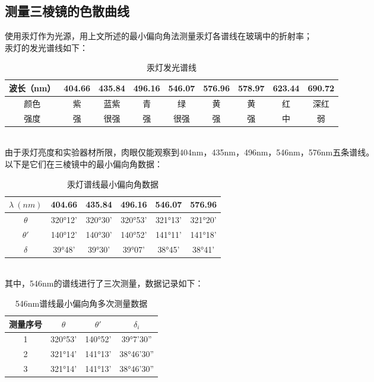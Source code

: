 \documentclass[UTF8]{ctexart}
\begin{document}
\subsection{测量三棱镜的色散曲线}
使用汞灯作为光源，用上文所述的最小偏向角法测量汞灯各谱线在玻璃中的折射率；\\
汞灯的发光谱线如下：\\
\begin{table}[h]
    \begin{center}
        \begin{tabular}{|c|c|c|c|c|c|c|c|c|}  
            \hline    
            波长（nm）& 404.66 & 435.84 & 496.16 & 546.07 & 576.96 & 578.97 & 623.44 & 690.72 \\
            \hline
            颜色 & 紫 & 蓝紫  & 青 & 绿 & 黄 & 黄 & 红 & 深红 \\
            \hline
            强度 &强 &很强 & 强 &很强 & 强 & 强 & 中 & 弱 \\
            \hline
        \end{tabular}
        \caption{汞灯发光谱线}
    \end{center}
\end{table}
\\
由于汞灯亮度和实验器材所限，肉眼仅能观察到404nm，435nm，496nm，546nm，576nm五条谱线。
\\
以下是它们在三棱镜中的最小偏向角数据：\\
\begin{table}[h]
    \begin{center}
        \begin{tabular}{|c|c|c|c|c|c|}
        \hline
        \(\lambda \ (nm)\)&404.66 & 435.84 & 496.16 & 546.07 & 576.96 \\
        \hline
        \(\theta\)&320°12'&320°30'&320°53'&321°13'&321°20'\\
        \hline
        \(\theta'\)&140°12'&140°30'&140°52'&141°11'&141°18'\\
        \hline
        \(\delta\)&39°48'&39°30'&39°07'&38°45'&38°41'\\
        \hline
        \end{tabular}
        \caption{汞灯谱线最小偏向角数据}
    \end{center}
\end{table}\\
其中，546nm的谱线进行了三次测量，数据记录如下：\\
\begin{table}[h]
    \begin{center}
        \begin{tabular}{|c|c|c|c|}
            \hline
            测量序号 & \(\theta\) & \(\theta'\) & \(\delta_i\)\\
            \hline
            1 & 320°53' & 140°52' & 39°7'30'' \\
            \hline
            2 & 321°14' & 141°13' & 38°46'30'' \\
            \hline
            3 & 321°14' & 141°13' & 38°46'30'' \\
            \hline
        \end{tabular}
        \caption{546nm谱线最小偏向角多次测量数据}
    \end{center}
\end{table}
\end{document}
